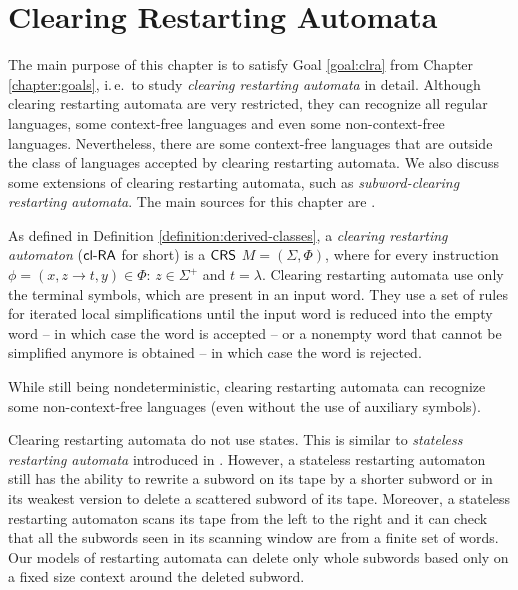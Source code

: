 \chapter{Clearing Restarting Automata}\label{chapter:clra}

The main purpose of this chapter is to satisfy Goal \ref{goal:clra} from Chapter \ref{chapter:goals}, i.\,e.\ to study \emph{clearing restarting automata} in detail. Although clearing restarting automata are very restricted, they can recognize all regular languages, some context-free languages and even some non-context-free languages. Nevertheless, there are some context-free languages that are outside the class of languages accepted by clearing restarting automata. We also discuss some extensions of clearing restarting automata, such as \emph{subword-clearing restarting automata}. The main sources for this chapter are \citep{CM09, C10Diploma, CM10}.

As defined in Definition \ref{definition:derived-classes}, a \emph{clearing restarting automaton} (\index{$\clRA$}\emph{$\clRA$} for short) is a $\textup{\sf CRS\/}$ $M = (\Sigma, \Phi)$, where for every instruction $\phi = (x, z \to t, y) \in \Phi$: $z \in \Sigma^+$ and $t = \lambda$. Clearing restarting automata use only the terminal symbols, which are present in an input word. They use a set of rules for iterated local simplifications until the input word is reduced into the empty word -- in which case the word is accepted -- or a nonempty word that cannot be simplified anymore is obtained -- in which case the word is rejected.

While still being nondeterministic, clearing restarting automata can recognize some non-context-free languages (even without the use of auxiliary symbols).

Clearing restarting automata do not use states. This is similar to \emph{stateless restarting automata} introduced in \citep{KuMeOt08}. However, a stateless restarting automaton still has the ability to rewrite a subword on its tape by a shorter subword or in its weakest version to delete a scattered subword of its tape. Moreover, a stateless restarting automaton scans its tape from the left to the right and it can check that all the subwords seen in its scanning window are from a finite set of words. Our models of restarting automata can delete only whole subwords based only on a fixed size context around the deleted subword.

